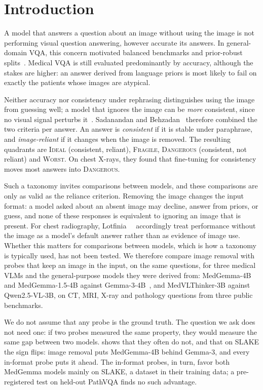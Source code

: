 \documentclass[10pt,twocolumn,letterpaper]{article}
\newcommand{\dang}{\textup{\textsc{Dangerous}}}
\begin{document}
\section{Introduction}
\label{sec:intro}
A model that answers a question about an image without using the image is not performing visual question
answering, however accurate its answers. In general-domain VQA, this concern motivated balanced benchmarks and
prior-robust splits~\cite{goyal2017vqav2,agrawal2018dont}. Medical VQA is still evaluated predominantly by
accuracy, although the stakes are higher: an answer derived from language priors is most likely to fail on
exactly the patients whose images are atypical.

Neither accuracy nor consistency under rephrasing distinguishes using the image from guessing well; a model that
ignores the image can be \emph{more} consistent, since no visual signal perturbs it~\cite{sadanandan2026psfmed}.
Sadanandan and Behzadan~\cite{sadanandan2026consistent} therefore combined the two criteria per answer. An
answer is \emph{consistent} if it is stable under paraphrase, and \emph{image-reliant} if it changes when the
image is removed. The resulting quadrants are \textsc{Ideal} (consistent, reliant), \textsc{Fragile},
\dang{} (consistent, not reliant) and \textsc{Worst}. On chest X-rays, they found that fine-tuning for
consistency moves most answers into \dang{}.

Such a taxonomy invites comparisons between models, and these comparisons are only as valid as the reliance
criterion. Removing the image changes the input format: a model asked about an absent image may decline, answer
from priors, or guess, and none of these responses is equivalent to ignoring an image that is present. For chest
radiography, Lotfinia~\etal~\cite{lotfinia2026cxr} accordingly treat performance without the image as a model's
default answer rather than as evidence of image use. Whether this matters for comparisons between models, which is
how a taxonomy is typically used, has not been tested. We therefore compare image removal with probes that keep an
image in the input, on the same questions, for three medical VLMs and the general-purpose models they were derived
from: MedGemma-4B~\cite{sellergren2025medgemma} and MedGemma-1.5-4B against Gemma-3-4B~\cite{gemma2025gemma3}, and
MedVLThinker-3B against Qwen2.5-VL-3B, on CT, MRI, X-ray and pathology questions from three public benchmarks.

We do not assume that any probe is the ground truth. The question we ask does not need one: if two probes
measured the same property, they would measure the same gap between two models.  shows that
they often do not, and that on SLAKE the sign flips: image removal puts MedGemma-4B behind Gemma-3, and every
in-format probe puts it ahead. The in-format probes, in turn, favor both MedGemma models mainly on SLAKE, a dataset
in their training data; a pre-registered test on held-out PathVQA finds no such advantage.
\end{document}
